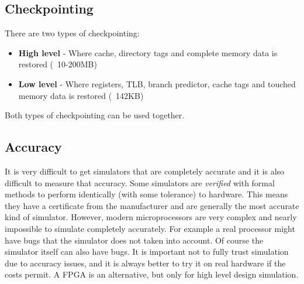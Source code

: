 \documentclass[11pt]{article}
\begin{document}
\subsection{Checkpointing}
There are two types of checkpointing:
\begin{itemize}
\item \textbf{High level} - Where cache, directory tags and complete memory data is restored (~10-200MB)
\item \textbf{Low level} - Where registers, TLB, branch predictor, cache tags and touched memory data is restored (~142KB)
\end{itemize}
Both types of checkpointing can be used together. 

\subsection{Accuracy}
It is very difficult to get simulators that are completely accurate and it is also difficult to measure that accuracy. Some simulators are \textit{verified} with formal methods to perform identically (with some tolerance) to hardware. This means they have a certificate from the manufacturer and are generally the most accurate kind of simulator. 
\n
However, modern microprocessors are very complex and nearly impossible to simulate completely accurately. For example a real processor might have bugs that the simulator does not taken into account. Of course the simulator itself can also have bugs. It is important not to fully trust simulation due to accuracy issues, and it is always better to try it on real hardware if the costs permit. A FPGA is an alternative, but only for high level design simulation. 
\end{document}
